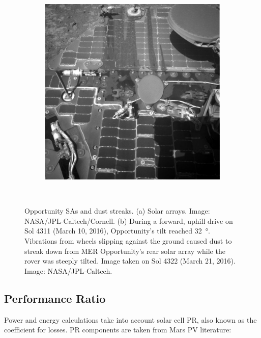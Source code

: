 \begin{figure}[h]
\begin{subfigure}[t]{\subfigureWidth}
            \includegraphics[height=\graphicsHeight]{sections/mars-solar-energy/photovoltaic-energy/images/mer-opportunity-dust-streaks.png}
            \label{fig:image:mer-opportunity-dust-streaks}
    \end{subfigure}\\[0.8ex]
    \caption[Opportunity solar arrays and dust streaks]
    {Opportunity \acp{SA} and dust streaks. (a) Solar arrays. Image: \ac{NASA}/\ac{JPL}-Caltech/Cornell. (b) During a forward, uphill drive on Sol 4311 (March 10, 2016), Opportunity's tilt reached \SI{32}{\degree}. Vibrations from wheels slipping against the ground caused dust to streak down from \ac{MER} Opportunity's rear solar array while the rover was steeply tilted. Image taken on Sol 4322 (March 21, 2016). Image: \ac{NASA}/\ac{JPL}-Caltech.}
    \label{fig:mer-solar-arrays-and-dust-streaks}
\vspace{-2ex}
\end{figure}




\subsection{Performance Ratio}
\label{sec:PowerAndEnergyPredictions:PerformanceRatio}
Power and energy calculations take into account solar cell \ac{PR}, also known as the coefficient for losses. \ac{PR} components are taken from Mars \ac{PV} literature:

